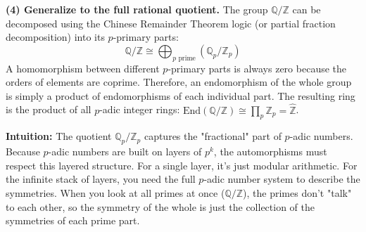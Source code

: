 \begin{solution}
\textbf{(4) Generalize to the full rational quotient.}
The group $\mathbb{Q} / \mathbb{Z}$ can be decomposed using the Chinese Remainder Theorem logic (or partial fraction decomposition) into its $p$-primary parts:
\[ \mathbb{Q} / \mathbb{Z} \cong \bigoplus_{p \text{ prime}} (\mathbb{Q}_p / \mathbb{Z}_p) \]
A homomorphism between different $p$-primary parts is always zero because the orders of elements are coprime.
Therefore, an endomorphism of the whole group is simply a product of endomorphisms of each individual part.
The resulting ring is the product of all $p$-adic integer rings: $\text{End}(\mathbb{Q} / \mathbb{Z}) \cong \prod_p \mathbb{Z}_p = \hat{\mathbb{Z}}$.

\textbf{Intuition:}
The quotient $\mathbb{Q}_p / \mathbb{Z}_p$ captures the "fractional" part of $p$-adic numbers. Because $p$-adic numbers are built on layers of $p^k$, the automorphisms must respect this layered structure. For a single layer, it's just modular arithmetic. For the infinite stack of layers, you need the full $p$-adic number system to describe the symmetries. When you look at all primes at once ($\mathbb{Q}/\mathbb{Z}$), the primes don't "talk" to each other, so the symmetry of the whole is just the collection of the symmetries of each prime part.
\end{solution}

